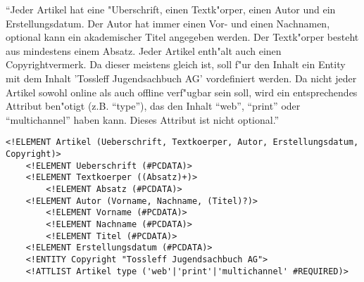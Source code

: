 \noindent
"`Jeder Artikel hat eine "Uberschrift, einen Textk"orper, einen Autor und ein Erstellungsdatum.
Der Autor hat immer einen Vor- und einen Nachnamen, optional kann ein akademischer Titel angegeben werden.
Der Textk"orper besteht aus mindestens einem Absatz.
Jeder Artikel enth"alt auch einen Copyrightvermerk.
Da dieser meistens gleich ist, soll f"ur den Inhalt ein Entity mit dem Inhalt 'Tossleff Jugendsachbuch AG' vordefiniert werden.
Da nicht jeder Artikel sowohl online als auch offline verf"ugbar sein soll, wird ein entsprechendes Attribut ben"otigt (z.B. "`type"'), das den Inhalt "`web"', "`print"' oder "`multichannel"' haben kann.
Dieses Attribut ist nicht optional."'\\

\lstset{style=customXML}
\begin{lstlisting}
<!ELEMENT Artikel (Ueberschrift, Textkoerper, Autor, Erstellungsdatum, Copyright)>
    <!ELEMENT Ueberschrift (#PCDATA)>
    <!ELEMENT Textkoerper ((Absatz)+)>
        <!ELEMENT Absatz (#PCDATA)>
    <!ELEMENT Autor (Vorname, Nachname, (Titel)?)>
        <!ELEMENT Vorname (#PCDATA)>
        <!ELEMENT Nachname (#PCDATA)>
        <!ELEMENT Titel (#PCDATA)>
    <!ELEMENT Erstellungsdatum (#PCDATA)>
    <!ENTITY Copyright "Tossleff Jugendsachbuch AG">
    <!ATTLIST Artikel type ('web'|'print'|'multichannel' #REQUIRED)>
\end{lstlisting}




